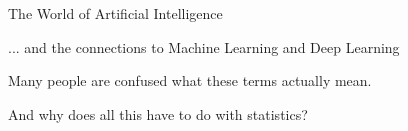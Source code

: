 \documentclass[11pt,compress,t,notes=noshow, xcolor=table]{beamer}
\begin{document}

\begin{frame}{The World of Artificial Intelligence}

... and the connections to Machine Learning and Deep Learning


\begin{center}

  \begin{figure}
  \end{figure}

  \lz

Many people are confused what these terms actually mean. 

\lz

And why does all this have to do with statistics?

  

%  
  
  \end{center}
  
\end{frame}

\end{document}
